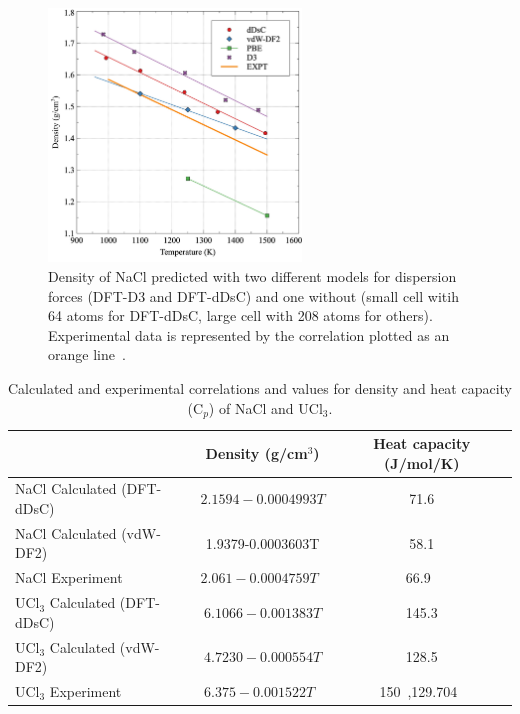 \documentclass[preprint,3p,10pt,onecolumn,number,sort&compress]{elsarticle}
\begin{document}
{\begin{figure}[htb]
\centering
\includegraphics[width=0.6\textwidth]{fig3a.jpg}
\caption{Density of NaCl predicted with two different models for dispersion forces (DFT-D3 and DFT-dDsC) and one without (small cell witih 64 atoms for DFT-dDsC, large cell with 208 atoms for others). Experimental data is represented by the correlation plotted as an orange line~\cite{Janz1988}.} %
\label{fig:NaCldensity}
\end{figure}

\begin{table}[hb!]
\centering
\begin{tabular}{lcc}
\hline
\hline
& Density (g/cm$^3$) &Heat capacity (J/mol/K) \\
\hline
NaCl Calculated (DFT-dDsC)	&$2.1594-0.0004993T$ &71.6 \\
NaCl Calculated (vdW-DF2)	& 1.9379-0.0003603T & 58.1 \\
NaCl Experiment	&$2.061-0.0004759T$~\cite{Janz1988} &66.9~\cite{NIST} \\	
UCl$_3$ Calculated (DFT-dDsC) &$6.1066-0.001383T$ &145.3 \\	
UCl$_3$ Calculated (vdW-DF2) &$4.7230-0.000554T$ & 128.5 \\	
UCl$_3$ Experiment	&$6.375-0.001522T$~\cite{Desyatnik} &150~\cite{BENES2008},129.704~\cite{YIN2020} \\
\hline
\hline
\end{tabular}
\caption{Calculated and experimental correlations and values for density and heat capacity (C$_p$) of NaCl and UCl$_3$. }%
\label{table:NaCldensityetc}
\end{table}

}
\end{document}
